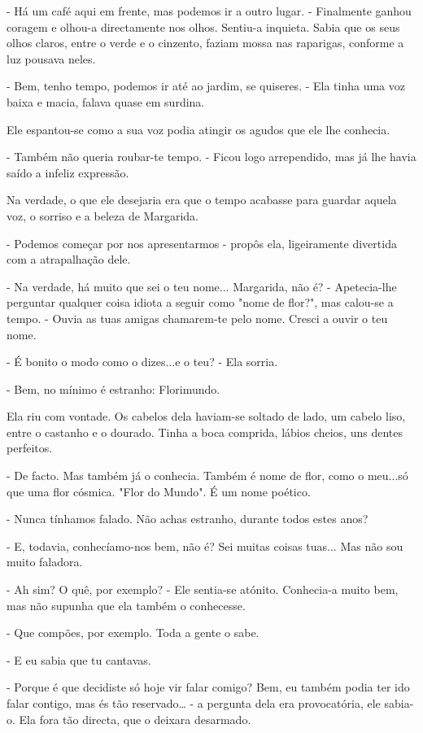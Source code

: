 - Há um café aqui em frente, mas podemos ir a outro lugar. - Finalmente
ganhou coragem e olhou-a directamente nos olhos. Sentiu-a inquieta.
Sabia que os seus olhos claros, entre o verde e o cinzento, faziam mossa
nas raparigas, conforme a luz pousava neles.

- Bem, tenho tempo, podemos ir até ao jardim, se quiseres. - Ela tinha
uma voz baixa e macia, falava quase em surdina.

Ele espantou-se como a sua voz podia atingir os agudos que ele lhe
conhecia.

- Também não queria roubar-te tempo. - Ficou logo arrependido, mas já
lhe havia saído a infeliz expressão.

Na verdade, o que ele desejaria era que o tempo acabasse para guardar
aquela voz, o sorriso e a beleza de Margarida.

- Podemos começar por nos apresentarmos - propôs ela, ligeiramente
divertida com a atrapalhação dele.

- Na verdade, há muito que sei o teu nome... Margarida, não é? -
Apetecia-lhe perguntar qualquer coisa idiota a seguir como "nome de
flor?", mas calou-se a tempo. - Ouvia as tuas amigas chamarem-te pelo
nome. Cresci a ouvir o teu nome.

- É bonito o modo como o dizes...e o teu? - Ela sorria.

- Bem, no mínimo é estranho: Florimundo.

Ela riu com vontade. Os cabelos dela haviam-se soltado de lado, um
cabelo liso, entre o castanho e o dourado. Tinha a boca comprida, lábios
cheios, uns dentes perfeitos.

- De facto. Mas também já o conhecia. Também é nome de flor, como o
meu...só que uma flor cósmica. "Flor do Mundo". É um nome poético.

- Nunca tínhamos falado. Não achas estranho, durante todos estes anos?

- E, todavia, conhecíamo-nos bem, não é? Sei muitas coisas tuas... Mas
não sou muito faladora.

- Ah sim? O quê, por exemplo? - Ele sentia-se atónito. Conhecia-a muito
bem, mas não supunha que ela também o conhecesse.

- Que compões, por exemplo. Toda a gente o sabe.

- E eu sabia que tu cantavas.

- Porque é que decidiste só hoje vir falar comigo? Bem, eu também podia
ter ido falar contigo, mas és tão reservado\ldots{} - a pergunta dela
era provocatória, ele sabia-o. Ela fora tão directa, que o deixara
desarmado.

